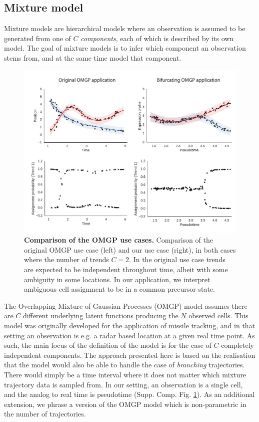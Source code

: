 \subsection{Mixture model}

Mixture models are hierarchical models where an observation is assumed to be generated from one of $ C $ \textit{components}, each of which is described by its own model. The goal of mixture models is to infer which component an observation stems from, and at the same time model that component.

\begin{figure}
    \centering
    \includegraphics[width=\textwidth]{"fig-omgp-apps"}
    \caption[Comparison of the OMGP use cases]{\textbf{Comparison of the OMGP use cases.} Comparison of the original OMGP use case (left) and our use case (right), in both cases where the number of trends \( C = 2 \). In the original use case trends are expected to be independent throughout time, albeit with some ambiguity in some locations. In our application, we interpret ambiguous cell assignment to be in a common precursor state.}
    \label{fig:omgpapps}
\end{figure}

The Overlapping Mixture of Gaussian Processes (OMGP) model \cite{Lazaro-Gredilla2012-ta} assumes there are $ C $ different underlying latent functions producing the $ N $ observed cells. This model was originally developed for the application of missile tracking, and in that setting an observation is e.g. a radar based location at a given real time point. As such, the main focus of the definition of the model is for the case of $ C $ completely independent components. The approach presented here is based on the realisation that the model would also be able to handle the case of \textit{branching} trajectories. There would simply be a time interval where it does not matter which mixture trajectory data is sampled from. In our setting, an observation is a single cell, and the analog to real time is pseudotime (Supp. Comp. Fig. \ref{fig:omgpapps}). As an additional extension, we phrase a version of the OMGP model which is non-parametric in the number of trajectories.

